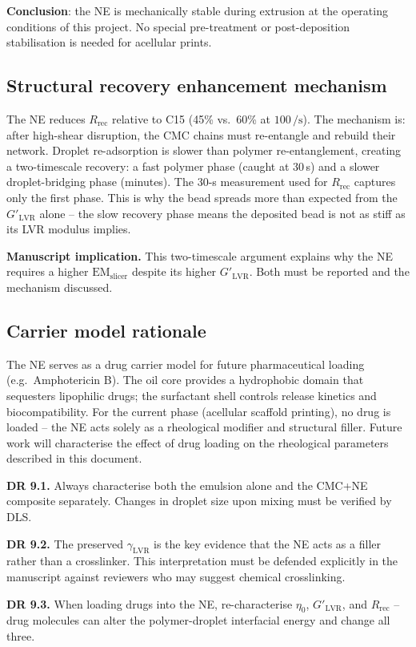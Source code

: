 \documentclass[11pt,a4paper]{article}
\begin{document}
\textbf{Conclusion}: the NE is mechanically stable during extrusion at
the operating conditions of this project. No special pre-treatment or
post-deposition stabilisation is needed for acellular prints.

\subsection{Structural recovery enhancement mechanism}

The NE reduces $R_\mathrm{rec}$ relative to C15 (45\% vs.\ 60\% at
$100\,\si{\per\s}$). The mechanism is: after high-shear disruption,
the CMC chains must re-entangle and rebuild their network. Droplet
re-adsorption is slower than polymer re-entanglement, creating a
two-timescale recovery: a fast polymer phase (caught at 30\,\si{\s})
and a slower droplet-bridging phase (minutes). The 30-\si{\s}
measurement used for $R_\mathrm{rec}$ captures only the first phase.
This is why the bead spreads more than expected from the $G'_\mathrm{LVR}$
alone -- the slow recovery phase means the deposited bead is not as
stiff as its LVR modulus implies.

\textbf{Manuscript implication.} This two-timescale argument explains
why the NE requires a higher $\mathrm{EM}_\mathrm{slicer}$ despite its
higher $G'_\mathrm{LVR}$. Both must be reported and the mechanism
discussed.

\subsection{Carrier model rationale}

The NE serves as a drug carrier model for future pharmaceutical
loading (e.g.\ Amphotericin B). The oil core provides a hydrophobic
domain that sequesters lipophilic drugs; the surfactant shell controls
release kinetics and biocompatibility. For the current phase (acellular
scaffold printing), no drug is loaded -- the NE acts solely as a
rheological modifier and structural filler. Future work will characterise
the effect of drug loading on the rheological parameters described in
this document.

\begin{designrulebox}
\textbf{DR 9.1.} Always characterise both the emulsion alone and the
CMC+NE composite separately. Changes in droplet size upon mixing must
be verified by DLS.

\textbf{DR 9.2.} The preserved $\gamma_\mathrm{LVR}$ is the key
evidence that the NE acts as a filler rather than a crosslinker. This
interpretation must be defended explicitly in the manuscript against
reviewers who may suggest chemical crosslinking.

\textbf{DR 9.3.} When loading drugs into the NE, re-characterise
$\eta_0$, $G'_\mathrm{LVR}$, and $R_\mathrm{rec}$ -- drug molecules
can alter the polymer-droplet interfacial energy and change all three.
\end{designrulebox}
\end{document}
